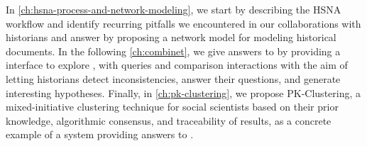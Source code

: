 


In \autoref{ch:hsna-process-and-network-modeling}, we start by describing the HSNA workflow and identify recurring pitfalls we encountered in our collaborations with historians and answer \qone by proposing a network model for modeling historical documents.
In the following \autoref{ch:combinet}, we give answers to \qtwo by providing a \va interface to explore \modelplural, with queries and comparison interactions with the aim of letting historians detect inconsistencies, answer their questions, and generate interesting hypotheses.
Finally, in \autoref{ch:pk-clustering}, we propose PK-Clustering, a mixed-initiative clustering technique for social scientists based on their prior knowledge, algorithmic consensus, and traceability of results, as a concrete example of a system providing answers to \qthree.


